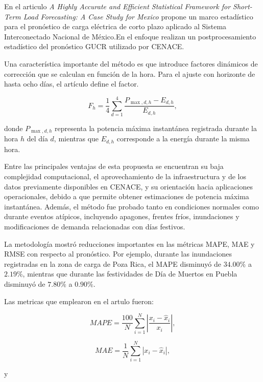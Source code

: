En el articulo \textit{A Highly Accurate and Efficient Statistical Framework for Short-Term Load Forecasting: A Case Study for Mexico}
propone un marco estadístico para el pronóstico de carga eléctrica de corto plazo aplicado al Sistema Interconectado Nacional de México.En el enfoque realizan un postprocesamiento estadístico del pronóstico GUCR utilizado por CENACE.

Una característica importante del método es que introduce factores dinámicos de corrección que se calculan en función de la hora. Para el ajuste con horizonte de hasta ocho días, el artículo define el factor.

\begin{equation}
F_h =
\frac{1}{4}
\sum_{d=1}^{4}
\frac{P_{\max,d,h}-E_{d,h}}
{E_{d,h}},
\end{equation}

donde $P_{\max,d,h}$ representa la potencia máxima instantánea
registrada durante la hora $h$ del día $d$, mientras que $E_{d,h}$
corresponde a la energía durante la misma hora.

Entre las principales ventajas de esta propuesta se encuentran su
baja complejidad computacional, el aprovechamiento de la
infraestructura y de los datos previamente disponibles en CENACE,
y su orientación hacia aplicaciones operacionales, debido a que
permite obtener estimaciones de potencia máxima instantánea. Además,
el método fue probado tanto en condiciones normales como durante
eventos atípicos, incluyendo apagones, frentes fríos, inundaciones
y modificaciones de demanda relacionadas con días festivos.

La metodología mostró reducciones importantes en las métricas MAPE,
MAE y RMSE con respecto al pronóstico. Por ejemplo, durante
las inundaciones registradas en la zona de carga de Poza Rica,
el MAPE disminuyó de $34.00\%$ a $2.19\%$, mientras que durante
las festividades de Día de Muertos en Puebla disminuyó de $7.80\%$
a $0.90\%$.

Las metricas que emplearon en el artulo fueron:

\begin{equation}
MAPE =
\frac{100}{N}
\sum_{i=1}^{N}
\left|
\frac{x_i-\hat{x}_i}{x_i}
\right|,
\end{equation}

\begin{equation}
MAE =
\frac{1}{N}
\sum_{i=1}^{N}
|x_i-\hat{x}_i|,
\end{equation}

y

